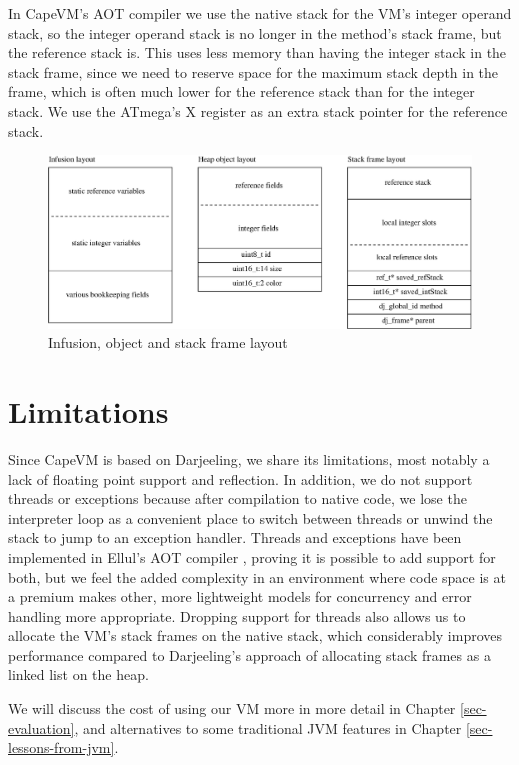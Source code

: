 In CapeVM's AOT compiler we use the native stack for the VM's integer operand stack, so the integer operand stack is no longer in the method's stack frame, but the reference stack is. This uses less memory than having the integer stack in the stack frame, since we need to reserve space for the maximum stack depth in the frame, which is often much lower for the reference stack than for the integer stack. We use the ATmega's X register as an extra stack pointer for the reference stack.

\begin{figure}
\centering
\includegraphics[width=0.8\linewidth]{object-and-stack-frame-layout.eps}
\caption{Infusion, object and stack frame layout}
\label{fig-object-and-stack-frame-layout}
\end{figure}


\section{Limitations}
Since CapeVM is based on Darjeeling, we share its limitations, most notably a lack of floating point support and reflection. In addition, we do not support threads or exceptions because after compilation to native code, we lose the interpreter loop as a convenient place to switch between threads or unwind the stack to jump to an exception handler. Threads and exceptions have been implemented in Ellul's AOT compiler \cite{Ellul:2012thesis}, proving it is possible to add support for both, but we feel the added complexity in an environment where code space is at a premium makes other, more lightweight models for concurrency and error handling more appropriate. Dropping support for threads also allows us to allocate the VM's stack frames on the native stack, which considerably improves performance compared to Darjeeling's approach of allocating stack frames as a linked list on the heap.

We will discuss the cost of using our VM more in more detail in Chapter \ref{sec-evaluation}, and alternatives to some traditional JVM features in Chapter \ref{sec-lessons-from-jvm}.



